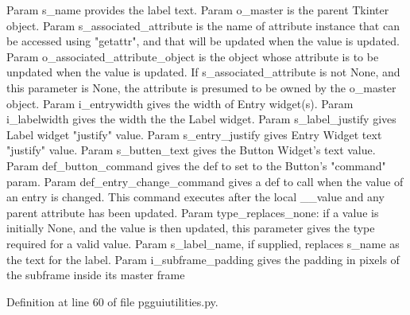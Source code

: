 \begin{DoxyVerb}Param s_name provides the label text.
Param o_master is the parent Tkinter object.
Param s_associated_attribute is the name of 
    attribute instance that can be accessed
    using "getattr", and that will be
    updated when the value is updated.
Param o_associated_attribute_object is the object whose attribute
    is to be unpdated when the value is updated.  If
    s_associated_attribute is not None, and this parameter
    is None, the attribute is presumed to be
    owned by the o_master object.
Param i_entrywidth gives the width of Entry widget(s).
Param i_labelwidth gives the width the the Label widget.
Param s_label_justify gives Label widget "justify" value.
Param s_entry_justify gives Entry Widget text "justify" value.
Param s_butten_text gives the Button Widget's text value.
Param def_button_command gives the def to set to the Button's "command" param.
Param def_entry_change_command gives a def to call when the value of an entry is changed.       
    This command executes after the local __value and any parent attribute has been updated.
Param type_replaces_none: if a value is initially None, and the value is then updated, this parameter
      gives the type required for a valid value.
Param s_label_name, if supplied, replaces s_name as the text for the label.
Param i_subframe_padding gives the padding in pixels of the subframe inside its master frame\end{DoxyVerb}
 

Definition at line 60 of file pgguiutilities.\+py.


